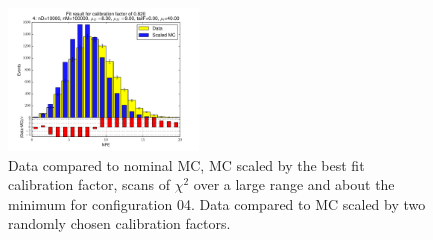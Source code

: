 \begin{figure}[htbp]
\begin{center}
\includegraphics[width=0.45\textwidth]{../FIGURES/04/FIG_Fit_result_for_calibration_factor_of_0_820.pdf} 
\caption{Data compared to nominal MC, MC scaled by the best fit calibration factor, scans of $\chi^2$ over a large range and about the minimum for configuration 04. Data compared to MC scaled by two randomly chosen calibration factors.} 
\label{tab:best_04} 
\end{center} \end{figure} 

